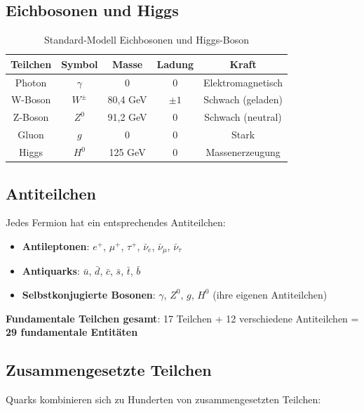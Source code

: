 	\subsection{Eichbosonen und Higgs}
	
	\begin{table}[htbp]
		\centering
		\begin{tabular}{|c|c|c|c|c|}
			\hline
			\textbf{Teilchen} & \textbf{Symbol} & \textbf{Masse} & \textbf{Ladung} & \textbf{Kraft} \\
			\hline
			\hline
			Photon & $\gamma$ & 0 & 0 & Elektromagnetisch \\
			W-Boson & $W^{\pm}$ & 80{,}4 GeV & $\pm 1$ & Schwach (geladen) \\
			Z-Boson & $Z^0$ & 91{,}2 GeV & 0 & Schwach (neutral) \\
			Gluon & $g$ & 0 & 0 & Stark \\
			Higgs & $H^0$ & 125 GeV & 0 & Massenerzeugung \\
			\hline
		\end{tabular}
		\caption{Standard-Modell Eichbosonen und Higgs-Boson}
		\label{tab:sm_bosons}
	\end{table}
	
	\subsection{Antiteilchen}
	
	Jedes Fermion hat ein entsprechendes Antiteilchen:
	
	\begin{itemize}
		\item \textbf{Antileptonen}: $e^+$, $\mu^+$, $\tau^+$, $\bar{\nu}_e$, $\bar{\nu}_\mu$, $\bar{\nu}_\tau$
		\item \textbf{Antiquarks}: $\bar{u}$, $\bar{d}$, $\bar{c}$, $\bar{s}$, $\bar{t}$, $\bar{b}$
		\item \textbf{Selbstkonjugierte Bosonen}: $\gamma$, $Z^0$, $g$, $H^0$ (ihre eigenen Antiteilchen)
	\end{itemize}
	
	\textbf{Fundamentale Teilchen gesamt}: 17 Teilchen + 12 verschiedene Antiteilchen = \textbf{29 fundamentale Entitäten}
	
	\subsection{Zusammengesetzte Teilchen}
	
	Quarks kombinieren sich zu Hunderten von zusammengesetzten Teilchen:
	
